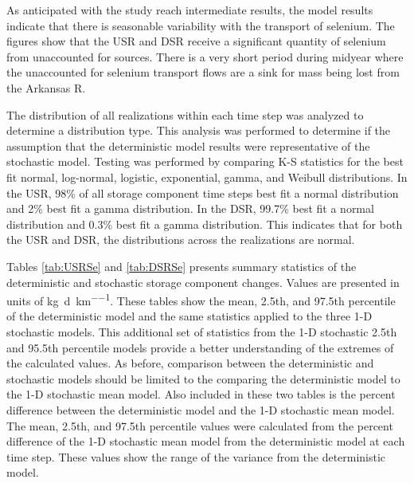 \begin{linenumbers}
As anticipated with the study reach intermediate results, the model results indicate that there is seasonable variability with the transport of selenium.  The figures show that the USR and DSR receive a significant quantity of selenium from unaccounted for sources.  There is a very short period during midyear where the unaccounted for selenium transport flows are a sink for mass being lost from the Arkansas R.

The distribution of all realizations within each time step was analyzed to determine a distribution type.  This analysis was performed to determine if the assumption that the deterministic model results were representative of the stochastic model.   Testing was performed by comparing K-S statistics for the best fit normal, log-normal, logistic, exponential, gamma, and Weibull distributions.  In the USR, 98\% of all storage component time steps best fit a normal distribution and 2\% best fit a gamma distribution.  In the DSR, 99.7\% best fit a normal distribution and 0.3\% best fit a gamma distribution.  This indicates that for both the USR and DSR, the distributions across the realizations are normal.  

Tables \ref{tab:USRSe} and \ref{tab:DSRSe} presents summary statistics of the deterministic and stochastic storage component changes.  Values are presented in units of \si{\kilo\gram\per\day\per\kilo\meter}.   These tables show the mean, 2.5th, and 97.5th percentile of the deterministic model and the same statistics applied to the three 1-D stochastic models.  This additional set of statistics from the 1-D stochastic 2.5th and 95.5th percentile models provide a better understanding of the extremes of the calculated values.  As before, comparison between the deterministic and stochastic models should be limited to the comparing the deterministic model to the 1-D stochastic mean model.  Also included in these two tables is the percent difference between the deterministic model and the 1-D stochastic mean model.  The mean, 2.5th, and 97.5th percentile values were calculated from the percent difference of the 1-D stochastic mean model from the deterministic model at each time step.  These values show the range of the variance from the deterministic model.


\end{linenumbers}
